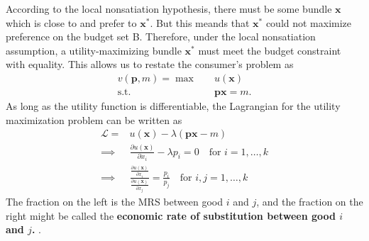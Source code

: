 According to the local nonsatiation hypothesis, there must be some bundle $\mathbf{x}$ which is close to and prefer to $\mathbf{x}^*$.
But this meands that $\mathbf{x}^*$ could not maximize preference on the budget set B. 
Therefore, under the local nonsatiation assumption, a utility-maximizing bundle $\mathbf{x}^*$ must meet the budget constraint with equality.
This allows us to restate the consumer's problem as
\begin{align*}
    v(\mathbf{p}, m) = \max & \quad u(\mathbf{x}) \\
    \text{s.t.} & \quad \mathbf{px} = m.
\end{align*}
As long as the utility function is differentiable, the Lagrangian for the utility maximization problem can be written as
\begin{align*}
    \mathcal{L} =& u(\mathbf{x}) - \lambda (\mathbf{px} - m) \\
    \implies & \frac{\partial u(\mathbf x)}{\partial x_i} -\lambda p_i = 0 \quad \text{for } i =1, \dots, k \\
    \implies & \frac{\frac{\partial u(\mathbf{x})}{\partial x_i}}{\frac{\partial u(\mathbf{x})}{\partial x_j}} = \frac{p_i}{p_j} \quad \text{for } i,j = 1, \dots, k
\end{align*}
The fraction on the left is the MRS between good $i$ and $j$, and the fraction on the right might be called the \textbf{economic rate of substitution between good $i$ and $j$.} 
.

